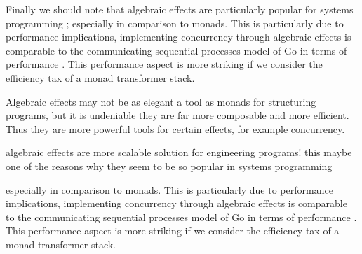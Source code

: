 Finally we should note that
algebraic effects are particularly popular for systems programming
\cite{dolan2015effective, dolan2017concurrent, dolaneffectively};
especially in comparison to monads.
This is particularly due to performance implications,
implementing concurrency through algebraic effects
is comparable to the communicating sequential processes model
of Go in terms of performance \cite{Dolan:2017}.
This performance aspect is more striking
if we consider the efficiency tax of a monad
transformer stack\cite{o2008real}.

Algebraic effects may not be as elegant a tool as monads for structuring programs,
but it is undeniable they are far more composable and more efficient.
Thus they are more powerful tools for certain effects,
for example concurrency.

algebraic effects are more scalable solution for engineering programs!
this maybe one of the reasons why they seem to be so popular in systems
programming

especially in comparison to monads.
This is particularly due to performance implications,
implementing concurrency through algebraic effects
is comparable to the communicating sequential processes model
of Go in terms of performance \cite{Dolan:2017}.
This performance aspect is more striking
if we consider the efficiency tax of a monad
transformer stack\cite{o2008real}.

